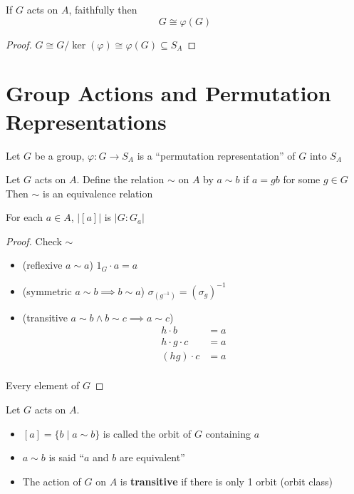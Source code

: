 \begin{observation}
  If $G$ acts on $A$, faithfully then
  \[G \cong \varphi(G)\]
\end{observation}

\begin{proof}
  $G \cong G/\ker(\varphi) \cong \varphi(G) \subseteq S_A$
\end{proof}


\section{Group Actions and Permutation Representations}

\begin{definition}
  Let $G$ be a group, $\varphi: G \to S_A$ is a ``permutation representation'' of $G$ into $S_A$
\end{definition}

\begin{proposition}
  Let $G$ acts on $A$. Define the relation $\sim$ on $A$ by
  $a \sim b$ if $a = gb$ for some $g\in G$
  Then $\sim$ is an equivalence relation

  For each $a \in A$, $|[a]|$ is $|G : G_a|$
\end{proposition}

\begin{proof}
  Check $\sim$
  \begin{itemize}
    \item (reflexive $a \sim a$) $1_G\cdot a = a$
    \item (symmetric $a \sim b \implies b \sim a$) $\sigma_(g^{-1}) = (\sigma_g)^{-1}$
    \item (transitive $a \sim b \land b \sim c \implies a \sim c$) 
    \begin{align*}
      h\cdot b &= a \\
      h\cdot g\cdot c &= a \\
      (hg)\cdot c &= a \\
    \end{align*}
  \end{itemize}

  Every element of $G$  
\end{proof}

\begin{definition}
  Let $G$ acts on $A$. 
  \begin{itemize}
    \item $[a] = \{b \mid a \sim b\}$ is called the orbit of $G$ containing $a$
    \item $a \sim b$ is said ``$a$ and $b$ are equivalent''
    \item The action of $G$ on $A$ is \textbf{transitive} if there is only 1 orbit (orbit class)
  \end{itemize}
\end{definition}

